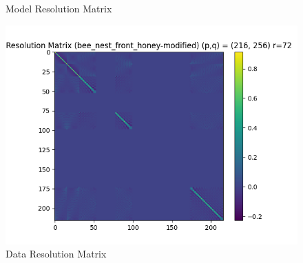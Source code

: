 \documentclass{article}
\begin{document}
\begin{itemize}
\begin{figure}[h]
    \caption{Model Resolution Matrix}
\end{figure}
\begin{figure}[h]
    \centering
    \includegraphics[width=1\textwidth]{images/outputs/datares/bee_nest_front_honey-modified.png}
    \caption{Data Resolution Matrix}
\end{figure}
\clearpage



\end{itemize}
\end{document}
